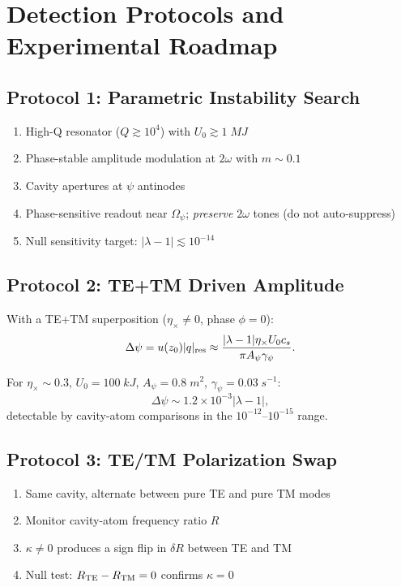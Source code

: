 \documentclass[aps,prd,twocolumn,superscriptaddress,floatfix,nofootinbib]{revtex4-2}
\newcommand{\Opsi}{\Omega_\psi}
\newcommand{\gpsi}{\gamma_\psi}
\newcommand{\lam}{\lambda}
\begin{document}
\section{Detection Protocols and Experimental Roadmap}\label{sec:detection}

\subsection{Protocol 1: Parametric Instability Search}

\begin{enumerate}[nosep]
\item High-Q resonator ($Q \gtrsim 10^4$) with $U_0 \gtrsim 1\;\si{MJ}$
\item Phase-stable amplitude modulation at $2\omega$ with $m \sim 0.1$
\item Cavity apertures at $\psi$ antinodes
\item Phase-sensitive readout near $\Opsi$; \emph{preserve} $2\omega$
tones (do not auto-suppress)
\item Null sensitivity target: $|\lam-1| \lesssim 10^{-14}$
\end{enumerate}

\subsection{Protocol 2: TE+TM Driven Amplitude}

With a TE+TM superposition ($\eta_\times \neq 0$, phase $\phi = 0$):
\begin{equation}
\Delta\psi = u(z_0)|q|_{\rm res}
\approx \frac{|\lam-1|\eta_\times U_0 c_s}{\pi A_\psi\gpsi}.
\end{equation}

For $\eta_\times \sim 0.3$, $U_0 = 100\;\si{kJ}$,
$A_\psi = 0.8\;\si{m^2}$, $\gpsi = 0.03\;\si{s^{-1}}$:
\begin{equation}
\Delta\psi \sim 1.2 \times 10^{-3}|\lam-1|,
\end{equation}
detectable by cavity-atom comparisons in the
$10^{-12}$--$10^{-15}$ range.

\subsection{Protocol 3: TE/TM Polarization Swap}

\begin{enumerate}[nosep]
\item Same cavity, alternate between pure TE and pure TM modes
\item Monitor cavity-atom frequency ratio $R$
\item $\kappa \neq 0$ produces a sign flip in $\delta R$ between TE and TM
\item Null test: $R_{\rm TE} - R_{\rm TM} = 0$ confirms $\kappa = 0$
\end{enumerate}
\end{document}
